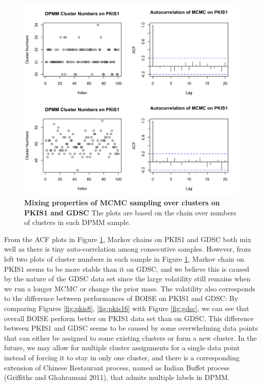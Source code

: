 \documentclass[12pt]{article}
\begin{document}
\begin{figure}[!ht]
\centering
\includegraphics[width=5.0in]{DPMM_performance.png}
\caption{\label{fig:mcmc} 
{\bf Mixing properties of MCMC sampling over clusters on PKIS1 and GDSC} The plots are based on the chain over numbers of clusters in each DPMM sample.}
\end{figure}

From the ACF plots in Figure \ref{fig:mcmc}, Markov chains on PKIS1 and GDSC both mix well as there is tiny auto-correlation among consecutive samples. However, from left two plots of cluster numbers in each sample in Figure \ref{fig:mcmc}, Markov chain on PKIS1 seems to be more stable than it on GDSC, and we believe this is caused by the nature of the GDSC data set since the large volatility still remains when we run a longer MCMC or change the prior mass. The volatility also corresponds to the difference between performances of BOISE on PKIS1 and GDSC: By comparing Figures  \ref{fig:pkis8}, \ref{fig:pkis16} with Figure \ref{fig:gdsc}, we can see that overall BOISE perform better on PKIS1 data set than on GDSC. This difference between PKIS1 and GDSC seems to be caused by some overwhelming data points that can either be assigned to some existing clusters or form a new cluster. In the future, we may allow for multiple cluster assignments for a single data point instead of forcing it to stay in only one cluster, and there is a corresponding extension of Chinese Restaurant process, named as Indian Buffet process (Griffiths and Ghahramani 2011), that admits multiple labels in DPMM. 
\end{document}
